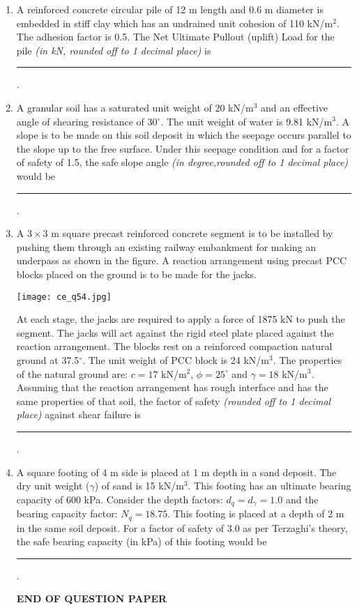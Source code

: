 \documentclass[12pt]{article}
\begin{document}
\begin{enumerate}[label= Q.\arabic*,start =26]
	\item A reinforced concrete circular pile of 12 m length and 0.6 m diameter is embedded in stiff clay which has an undrained unit cohesion of 110 kN/m$^2$. The adhesion factor is 0.5. The Net Ultimate Pullout (uplift) Load for the pile \textit{(in kN, rounded off to 1 decimal place)} is \rule{3cm}{0.15mm}.

	\item A granular soil has a saturated unit weight of 20 kN/m$^3$ and an effective angle of shearing resistance of 30$^\circ$. The unit weight of water is 9.81 kN/m$^3$. A slope is to be made on this soil deposit in which the seepage occurs parallel to the slope up to the free surface. Under this seepage condition and for a factor of safety of 1.5, the safe slope angle \textit{(in degree,rounded off to 1 decimal place)} would be \rule{3cm}{0.15mm}.

	\item A $3 \times 3$ m square precast reinforced concrete segment is to be installed by pushing them through an existing railway embankment for making an underpass as shown in the figure. A reaction arrangement using precast PCC blocks placed on the ground is to be made for the jacks.

		\begin{center}{

				\texttt{[image: ce\_q54.jpg]}
		}\end{center}

		At each stage, the jacks are required to apply a force of 1875 kN to push the segment. The jacks will act against the rigid steel plate placed against the reaction arrangement. The blocks rest on a reinforced compaction natural ground at 37.5$^\circ$. The unit weight of PCC block is 24 kN/m$^3$. The properties of the natural ground are: $c = 17$ kN/m$^2$, $\phi = 25^\circ$ and $\gamma = 18$ kN/m$^3$. Assuming that the reaction arrangement has rough interface and has the same properties of that soil, the factor of safety \textit{(rounded off to 1 decimal place)} against shear failure is \rule{3cm}{0.15mm}.

	\item A square footing of 4 m side is placed at 1 m depth in a sand deposit. The dry unit weight ($\gamma$) of sand is 15 kN/m$^3$. This footing has an ultimate bearing capacity of 600 kPa. Consider the depth factors: $d_q = d_\gamma = 1.0$ and the bearing capacity factor: $N_q = 18.75$. This footing is placed at a depth of 2 m in the same soil deposit. For a factor of safety of 3.0 as per Terzaghi's theory, the safe bearing capacity (in kPa) of this footing would be \rule{3cm}{0.15mm}.


		\begin{center}
			\textbf{END OF QUESTION PAPER }
		\end{center}


\end{enumerate}

			
\end{document}
